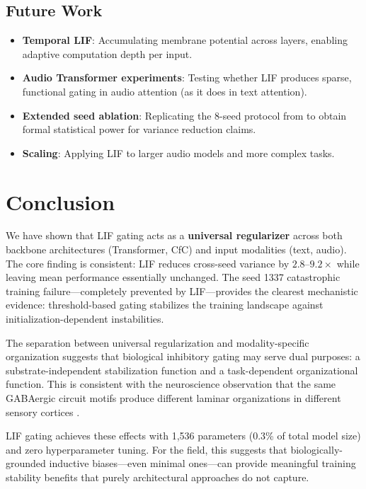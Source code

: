 \documentclass[11pt]{article}
\begin{document}
\subsection{Future Work}

\begin{itemize}
    \item \textbf{Temporal LIF}: Accumulating membrane potential across layers, enabling adaptive computation depth per input.
    \item \textbf{Audio Transformer experiments}: Testing whether LIF produces sparse, functional gating in audio attention (as it does in text attention).
    \item \textbf{Extended seed ablation}: Replicating the 8-seed protocol from \cite{tsubasa2026lif} to obtain formal statistical power for variance reduction claims.
    \item \textbf{Scaling}: Applying LIF to larger audio models and more complex tasks.
\end{itemize}


\section{Conclusion}

We have shown that LIF gating acts as a \textbf{universal regularizer} across both backbone architectures (Transformer, CfC) and input modalities (text, audio). The core finding is consistent: LIF reduces cross-seed variance by $2.8$--$9.2\times$ while leaving mean performance essentially unchanged. The seed 1337 catastrophic training failure---completely prevented by LIF---provides the clearest mechanistic evidence: threshold-based gating stabilizes the training landscape against initialization-dependent instabilities.

The separation between universal regularization and modality-specific organization suggests that biological inhibitory gating may serve dual purposes: a substrate-independent stabilization function and a task-dependent organizational function. This is consistent with the neuroscience observation that the same GABAergic circuit motifs produce different laminar organizations in different sensory cortices \cite{douglas2004neuronal}.

LIF gating achieves these effects with 1{,}536 parameters (0.3\% of total model size) and zero hyperparameter tuning. For the field, this suggests that biologically-grounded inductive biases---even minimal ones---can provide meaningful training stability benefits that purely architectural approaches do not capture.
\end{document}
